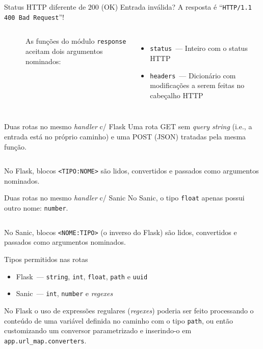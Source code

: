 \documentclass[utf8]{beamer}
\begin{document}
\begin{frame}[fragile]{Status HTTP diferente de $200$ (OK)}
  Entrada inválida?
  A resposta é ``\texttt{HTTP/1.1 400 Bad Request}''!
  \vfill
  \begin{columns}
    \inputminted[firstline=4]{python}{04_flask_400.py}
    \inputminted[firstline=4]{python}{04_sanic_400.py}

    \fontsize{.8em}{1.2em}\selectfont
    As funções do módulo \texttt{response}
    aceitam dois argumentos nominados:
    \begin{itemize}
      \item \texttt{status}~--- Inteiro com o status HTTP
      \item \texttt{headers}~--- Dicionário com modificações
                                 a serem feitas no cabeçalho HTTP
    \end{itemize}
  \end{columns}
\end{frame}


\begin{frame}[fragile]{Duas rotas no mesmo \emph{handler} c/ Flask}
  Uma rota GET sem \emph{query string}
  (i.e., a entrada está no próprio caminho)
  e uma POST (JSON) tratadas pela mesma função.
  \vfill
  \inputminted{python}{05_flask_biroute.py}
  \vfill
  No Flask, blocos \texttt{<TIPO:NOME>}
  são lidos, convertidos e passados como argumentos nominados.
\end{frame}


\begin{frame}[fragile]{Duas rotas no mesmo \emph{handler} c/ Sanic}
  No Sanic, o tipo \texttt{float} apenas possui outro nome:
  \texttt{number}.
  \vfill
  \inputminted{python}{05_sanic_biroute.py}
  \vfill
  No Sanic, blocos \texttt{<NOME:TIPO>} (o inverso do Flask)
  são lidos, convertidos e passados como argumentos nominados.
\end{frame}


\begin{frame}{Tipos permitidos nas rotas}
  \begin{itemize}
    \item Flask~--- \texttt{string}, \texttt{int}, \texttt{float},
                    \texttt{path} e \texttt{uuid}
    \item Sanic~--- \texttt{int}, \texttt{number} e \emph{regexes}
  \end{itemize}
  \vfill
  No Flask o uso de expressões regulares (\emph{regexes})
  poderia ser feito processando o conteúdo de uma variável
  definida no caminho com o tipo \texttt{path},
  ou então customizando um conversor parametrizado
  e inserindo-o em \texttt{app.url_map.converters}.
  \vfill
  \inputminted{python}{06_regex.py}
\end{frame}
\end{document}
